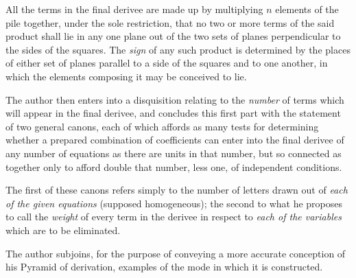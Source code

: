 \documentclass[11pt]{article}
\newcommand{\sourcepage}[1]{\marginpar{\scriptsize p.~#1}}
\begin{document}
\sourcepage{89}
All the terms in the final derivee are made up by multiplying $n$ elements of the pile together, under the sole restriction, that no two or more terms of the said product shall lie in any one plane out of the two sets of planes perpendicular to the sides of the squares. The \emph{sign} of any such product is determined by the places of either set of planes parallel to a side of the squares and to one another, in which the elements composing it may be conceived to lie.

The author then enters into a disquisition relating to the \emph{number} of terms which will appear in the final derivee, and concludes this first part with the statement of two general canons, each of which affords as many tests for determining whether a prepared combination of coefficients can enter into the final derivee of any number of equations as there are units in that number, but so connected as together only to afford double that number, less one, of independent conditions.

The first of these canons refers simply to the number of letters drawn out of \emph{each of the given equations} (supposed homogeneous); the second to what he proposes to call the \emph{weight} of every term in the derivee in respect to \emph{each of the variables} which are to be eliminated.

The author subjoins, for the purpose of conveying a more accurate conception of his Pyramid of derivation, examples of the mode in which it is constructed.
\end{document}
